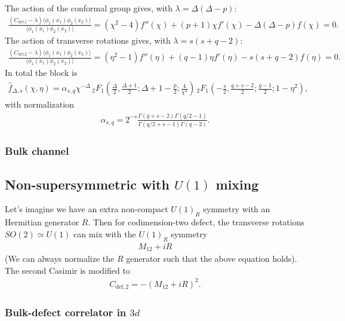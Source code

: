 \documentclass[letterpaper]{article}
\let\Oldsubsection\subsection
\renewcommand{\subsection}{\FloatBarrier\Oldsubsection}
\let\Oldsubsubsection\subsubsection
\renewcommand{\subsubsection}{\FloatBarrier\Oldsubsubsection}
\begin{document}
The action of the conformal group gives, with $\lambda = \Delta(\Delta-p)$:
\begin{align}
 \frac{(C_{\text{def,1}} - \lambda) \langle \phi_1(x_1) \phi_2(x_2) \rangle}
      {\langle \phi_1(x_1) \phi_2(x_2) \rangle}
 = (\chi^2 - 4) f''(\chi) + (p+1) \chi f'(\chi) - \Delta(\Delta-p) f(\chi)
 = 0.
\end{align}
The action of transverse rotations gives, with $\lambda = s(s + q - 2)$:
\begin{align}
 \frac{(C_{\text{def,2}} - \lambda) \langle \phi_1(x_1) \phi_2(x_2) \rangle}
      {\langle \phi_1(x_1) \phi_2(x_2) \rangle}
 = (\eta^2 - 1) f''(\eta) + (q-1) \eta f'(\eta) - s(s+q-2) f(\eta)
 = 0.
\end{align}
In total the block is
\begin{align}
 \hat f_{\Delta,s}(\chi,\eta) 
 = \alpha_{s,q} \chi ^{-\Delta } 
 \, _2F_1\left(\frac{\Delta }{2},\frac{\Delta +1}{2};\Delta+1-\frac{p}{2};\frac{4}{\chi ^2}\right)
 \, _2F_1\left(-\frac{s}{2},\frac{q+s-2}{2};\frac{q-1}{2};1-\eta ^2\right),
\end{align}
with normalization
\begin{align}
 \alpha_{s,q} = 2^{-s} \frac{\Gamma(q+s-2) \Gamma(q/2-1)}{\Gamma(q/2+s-1) \Gamma(q-2)}.
\end{align}


\subsubsection{Bulk channel}

\subsection{Non-supersymmetric with \texorpdfstring{$U(1)$}{U(1)} mixing}

Let's imagine we have an extra non-compact $U(1)_R$ symmetry with an Hermitian generator $R$.
Then for codimension-two defect, the transverse rotations $SO(2) \simeq U(1)$ can mix with the $U(1)_R$ symmetry
\begin{align}
 M_{12} + i R
\end{align}
(We can always normalize the $R$ generator such that the above equation holds).
The second Casimir is modified to
\begin{align}
C_{\text{def},2} = - (M_{12} + i R)^2.
\end{align}

\subsubsection{Bulk-defect correlator in \texorpdfstring{$3d$}{3d}}
\end{document}
